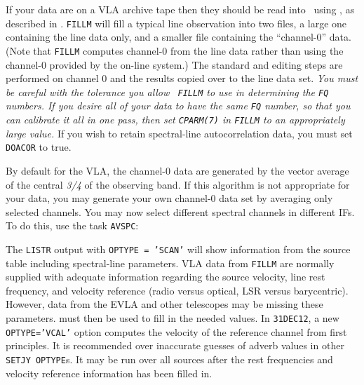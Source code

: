 
     If your data are on a VLA archive tape then they should be read
into \AIPS\ using {\tt {}}, as described in .
{\tt FILLM} will fill a typical line observation into two files, a
large one containing the line data only, and a smaller file containing
the ``channel-0'' data.  (Note that {\tt FILLM} computes channel-0
from the line data rather than using the channel-0 provided by the
on-line system.)  The standard  and editing steps
are performed on channel 0 and the results copied over to the line
data set.  {\it You must be careful with the tolerance you allow {\tt
FILLM} to use in determining the {\tt FQ} numbers.  If you desire all
of your data to have the same {\tt FQ} number, so that you can
calibrate it all in one pass, then set {\tt CPARM(7)} in {\tt FILLM}
to an appropriately large value.}  If you wish to retain spectral-line
autocorrelation data, you must set {\tt DOACOR} to true.

     By default for the VLA, the channel-0 data are generated by the
vector average of the central {\it 3/4\/} of the observing band.  If
this algorithm is not appropriate for your data, you may generate your
own channel-0 data set by averaging only selected channels.  You may
now select different spectral channels in different IFs.  To do this,
use the task {\tt AVSPC}:


     The {\tt LISTR} output with {\tt OPTYPE = 'SCAN'} will show
information from the source table including spectral-line parameters.
VLA data from {\tt FILLM} are normally supplied with adequate
information regarding the source velocity, line rest frequency, and
velocity reference (radio versus optical, LSR versus barycentric).
However, data from the EVLA and other telescopes may be missing these
parameters.  {\tt {}} must then be used to fill in the
needed values.  In {\tt 31DEC12}, a new {\tt OPTYPE='VCAL'} option
computes the velocity of the reference channel from first principles.
It is recommended over inaccurate guesses of adverb values in other
{\tt SETJY OPTYPE}s.  It may be run over all sources after the rest
frequencies and velocity reference information has been filled in.

